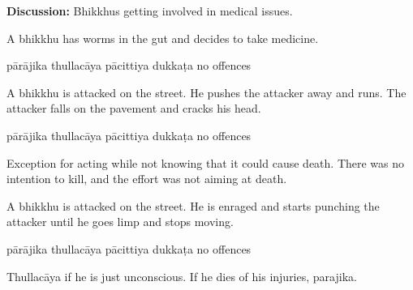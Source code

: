 \begin{exam}{\autoExamName}
\begin{problem*}
\begin{parts}
  \bigskip

  \textbf{Discussion:} Bhikkhus getting involved in medical issues.  

  \bigskip
  
  \item A bhikkhu has worms in the gut and decides to take medicine.

  \bigskip

  \begin{answers}{5}
    \bChoices
     pārājika\eAns
     thullacāya\eAns
     pācittiya\eAns
     dukkaṭa\eAns
     no offences\eAns
    \eChoices
  \end{answers}

  \item A bhikkhu is attacked on the street. He pushes the attacker away and runs. The
  attacker falls on the pavement and cracks his head.

  \bigskip

  \begin{answers}{5}
    \bChoices
     pārājika\eAns
     thullacāya\eAns
     pācittiya\eAns
     dukkaṭa\eAns
     no offences\eAns
    \eChoices
  \end{answers}

  \begin{solution}
    Exception for acting while not knowing that it could cause death. There was
    no intention to kill, and the effort was not aiming at death.
  \end{solution}

  \bigskip

  \item A bhikkhu is attacked on the street. He is enraged and starts punching the attacker
  until he goes limp and stops moving.

  \bigskip

  \begin{answers}{5}
    \bChoices
     pārājika\eAns
     thullacāya\eAns
     pācittiya\eAns
     dukkaṭa\eAns
     no offences\eAns
    \eChoices
  \end{answers}

  \begin{solution}
    Thullacāya if he is just unconscious. If he dies of his injuries, parajika.
  \end{solution}

\end{parts}

\end{problem*}

\end{exam}

